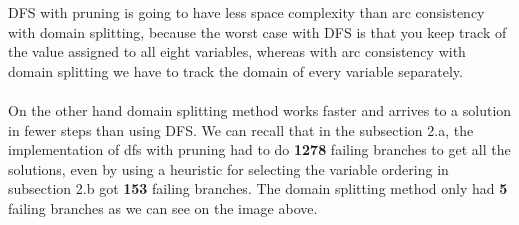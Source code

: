 \documentclass{article}
\def\ans#1{{\color{ans}#1}}
\begin{document}
\begin{enumerate}[label=(\alph*)]
    \ans{
        DFS with pruning is going to have less space complexity than arc consistency with domain splitting, 
        because the worst case with DFS is that you keep track of the value assigned to all eight variables, whereas with 
        arc consistency with domain splitting we have to track the domain of every variable separately. \\ \\
        On the other hand domain splitting method works faster and arrives to a solution in fewer 
        steps than using DFS. We can recall that in the subsection 2.a, the implementation of 
        dfs with pruning had to do \textbf{1278} failing branches to get all the solutions, even by 
        using a heuristic for selecting the variable ordering in subsection 2.b got \textbf{153} failing 
        branches. The domain splitting method only had \textbf{5} failing branches as we can see on the 
        image above.
    }
\end{enumerate}

\clearpage
\end{document}

